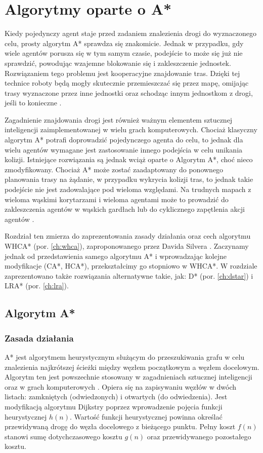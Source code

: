 \chapter{Algorytmy oparte o A*}
\label{ch:astar}

Kiedy pojedynczy agent staje przed zadaniem znalezienia drogi do wyznaczonego celu, prosty algorytm A* sprawdza się znakomicie. Jednak w przypadku, gdy wiele agentów porusza się w tym samym czasie, podejście to może się już nie sprawdzić, powodując wzajemne blokowanie się i zakleszczenie jednostek. Rozwiązaniem tego problemu jest kooperacyjne znajdowanie tras. Dzięki tej technice roboty będą mogły skutecznie przemieszczać się przez mapę, omijając trasy wyznaczone przez inne jednostki oraz schodząc innym jednostkom z drogi, jeśli to konieczne \cite{cooppath}.

Zagadnienie znajdowania drogi jest również ważnym elementem sztucznej inteligencji zaimplementowanej w wielu grach komputerowych. Chociaż klasyczny algorytm A* potrafi doprowadzić pojedynczego agenta do celu, to jednak dla wielu agentów wymagane jest zastosowanie innego podejścia w celu unikania kolizji. Istniejące rozwiązania są jednak wciąż oparte o Algorytm A*, choć nieco zmodyfikowany. Chociaż A* może zostać zaadaptowany do ponownego planowania trasy na żądanie, w przypadku wykrycia kolizji tras, to jednak takie podejście nie jest zadowalające pod wieloma względami. Na trudnych mapach z wieloma wąskimi korytarzami i wieloma agentami może to prowadzić do zakleszczenia agentów w wąskich gardłach lub do cyklicznego zapętlenia akcji agentów \cite{cooppath}.

Rozdział ten zmierza do zaprezentowania zasady działania oraz cech algorytmu WHCA* (por. \ref{ch:whca}), zaproponowanego przez Davida Silvera \cite{cooppath}. Zaczynamy jednak od przedstawienia samego algorytmu A* i wprowadzając kolejne modyfikacje (CA*, HCA*), przekształcimy go stopniowo w WHCA*.
W rozdziale zaprezentowano także rozwiązania alternatywne takie, jak: D* (por. \ref{ch:dstar}) i LRA* (por. \ref{ch:lra}).

\section{Algorytm A*}
\label{ch:astar-theory}
\subsection{Zasada działania}
A* jest algorytmem heurystycznym służącym do przeszukiwania grafu w celu znalezienia najkrótszej ścieżki między węzłem początkowym a węzłem docelowym. Algorytm ten jest powszechnie stosowany w zagadnieniach sztucznej inteligencji oraz w grach komputerowych \cite{mit_astar}. Opiera się na zapisywaniu węzłów w dwóch listach: zamkniętych (odwiedzonych) i otwartych (do odwiedzenia). Jest modyfikacją algorytmu Dijkstry poprzez wprowadzenie pojęcia funkcji heurystycznej $h(n)$. Wartość funkcji heurystycznej powinna określać przewidywaną drogę do węzła docelowego z bieżącego punktu. Pełny koszt $f(n)$ stanowi sumę dotychczasowego kosztu $g(n)$ oraz przewidywanego pozostałego kosztu.

